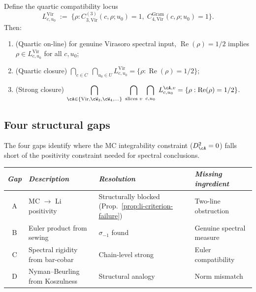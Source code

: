 \begin{conjecture}%
\label{conj:quartic-closure}%
\ClaimStatusConjectured%
%
%
Define the quartic compatibility locus
\begin{equation}\label{eq:compatibility-locus}
L_{c,u_0}^{\mathrm{Vir}}
\;:=\;
\bigl\{\rho :
C_{3,\mathrm{Vir}}^{(3)}(c,\rho;u_0) = 1,\;
C_{4,\mathrm{Vir}}^{\mathrm{Gram}}(c,\rho;u_0) = 1
\bigr\}.
\end{equation}
Then:
\begin{enumerate}[label=\textup{(\roman*)}]
\item
\textup{(}Quartic on-line\textup{)} for genuine Virasoro
spectral input, $\operatorname{Re}(\rho) = 1/2$ implies
$\rho \in L_{c,u_0}^{\mathrm{Vir}}$ for all
$c, u_0$\textup;
\item
\textup{(}Quartic closure\textup{)}
$\displaystyle\bigcap_{c \in C}\;\bigcap_{u_0 \in U}
L_{c,u_0}^{\mathrm{Vir}}
= \{\rho : \operatorname{Re}(\rho) = 1/2\}$\textup;
\item
\textup{(}Strong closure\textup{)}
$\displaystyle\bigcap_{\cA \in \{\mathrm{Vir},\cW_3,\cW_4,\ldots\}}
\;\bigcap_{\text{slices }v}
\;\bigcap_{c,u_0}\;
L_{c,u_0}^{\cA,v}
= \{\rho : \operatorname{Re}(\rho) = 1/2\}$.
\end{enumerate}
\end{conjecture}

\subsection{Four structural gaps}%
\label{sec:four-gaps}%

The four gaps identify where the MC integrability
constraint ($D_\cA^2 = 0$) falls short of the positivity
constraint needed for spectral conclusions.

\begin{center}
\small
\renewcommand{\arraystretch}{1.3}
\begin{tabular}{clll}
\toprule
\emph{Gap} & \emph{Description} & \emph{Resolution}
& \emph{Missing ingredient} \\
\midrule
A & MC $\to$ Li positivity
& Structurally blocked (Prop.~\ref{prop:li-criterion-failure})
& Two-line obstruction \\
B & Euler product from sewing
& $\sigma_{-1}$ found
& Genuine spectral measure \\
C & Spectral rigidity from bar-cobar
& Chain-level strong
& Euler compatibility \\
D & Nyman--Beurling from Koszulness
& Structural analogy
& Norm mismatch \\
\bottomrule
\end{tabular}
\end{center}

